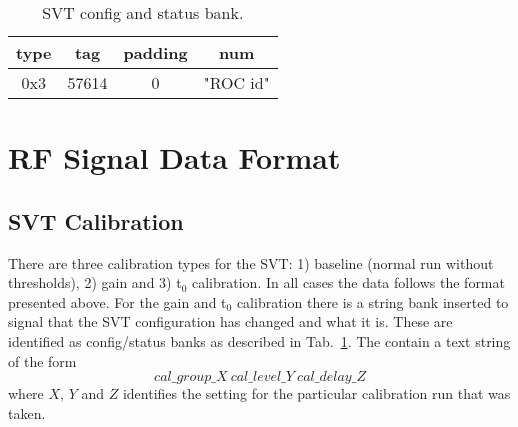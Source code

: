 \documentclass{desyproc}
\begin{document}
\begin{table}[]
  \begin{center}
    \caption{SVT config and status bank.}
    \label{tab:svt-config}
    \begin{tabular}{|c|c|c|c|}
   	\hline
    	 type & tag & padding & num \\
	 \hline
    	 0x3 & 57614 & 0 & "ROC id" \\
	 \hline
      \end{tabular}
  \end{center}
\end{table}



\section{RF Signal Data Format}

\subsection{SVT Calibration}

There are three calibration types for the SVT: 1) baseline  (normal run without thresholds), 2) gain and 3) t$_{0}$ calibration. In all cases the data follows the format presented above. For the gain and t$_0$ calibration there is a string bank inserted to signal that the SVT configuration has changed and what it is. These are identified as config/status banks as described in Tab.~\ref{tab:svt-config}. The contain a text string of the form 
\begin{equation}
cal\_group\_X\ cal\_level\_Y\ cal\_delay\_Z
\end{equation}
where $X$, $Y$ and $Z$ identifies the setting for the particular calibration run that was taken. 






\end{document}
